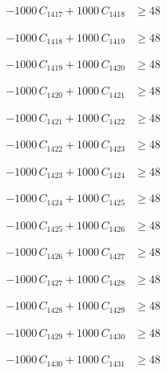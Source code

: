 \documentclass[a4paper,11pt]{article}
\begin{document}
\begin{align}
-1000\,C_{1417} + 1000\,C_{1418} &\geq 48 \nonumber
\end{align}

\begin{align}
-1000\,C_{1418} + 1000\,C_{1419} &\geq 48 \nonumber
\end{align}

\begin{align}
-1000\,C_{1419} + 1000\,C_{1420} &\geq 48 \nonumber
\end{align}

\begin{align}
-1000\,C_{1420} + 1000\,C_{1421} &\geq 48 \nonumber
\end{align}

\begin{align}
-1000\,C_{1421} + 1000\,C_{1422} &\geq 48 \nonumber
\end{align}

\begin{align}
-1000\,C_{1422} + 1000\,C_{1423} &\geq 48 \nonumber
\end{align}

\begin{align}
-1000\,C_{1423} + 1000\,C_{1424} &\geq 48 \nonumber
\end{align}

\begin{align}
-1000\,C_{1424} + 1000\,C_{1425} &\geq 48 \nonumber
\end{align}

\begin{align}
-1000\,C_{1425} + 1000\,C_{1426} &\geq 48 \nonumber
\end{align}

\begin{align}
-1000\,C_{1426} + 1000\,C_{1427} &\geq 48 \nonumber
\end{align}

\begin{align}
-1000\,C_{1427} + 1000\,C_{1428} &\geq 48 \nonumber
\end{align}

\begin{align}
-1000\,C_{1428} + 1000\,C_{1429} &\geq 48 \nonumber
\end{align}

\begin{align}
-1000\,C_{1429} + 1000\,C_{1430} &\geq 48 \nonumber
\end{align}

\begin{align}
-1000\,C_{1430} + 1000\,C_{1431} &\geq 48 \nonumber
\end{align}
\end{document}
